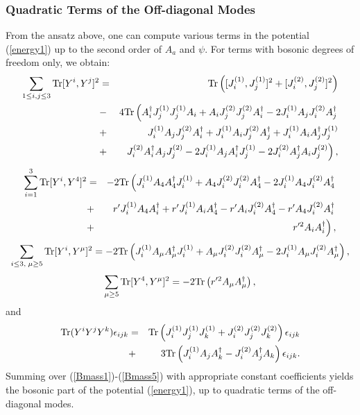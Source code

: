 \documentclass[a4paper,12pt]{article}
\begin{document}
\subsubsection{Quadratic Terms of the Off-diagonal Modes}
From the ansatz above, one can compute various terms in the potential (\ref{energy1}) up to the second order of $A_{a}$ and $\psi$. For terms with bosonic degrees of freedom only, we obtain:
\begin{eqnarray}
\sum_{1\leq i,j\leq 3}{\rm Tr}[Y^{i},Y^{j}]^{2}&=&{\rm Tr}\left([J^{(1)}_{i},J^{(1)}_{j}]^{2}+[J^{(2)}_{i},J^{(2)}_{j}]^{2}\right)\nonumber\\
&-&4{\rm Tr}\left(A_{i}^{\dag}J^{(1)}_{j}J^{(1)}_{j}A_{i}+ A_{i}J^{(2)}_{j}J^{(2)}_{j}A_{i}^{\dag}-2J^{(1)}_{i}A_{j}J^{(2)}_{i}
A_{j}^{\dag}\right.\nonumber\\
&+&J^{(1)}_{i}A_{j}J^{(2)}_{j}A_{i}^{\dag}+J^{(1)}_{i}A_{i}J^{(2)}_{j}A_{j}^{\dag}
+J^{(1)}_{i}A_{i}A_{j}^{\dag}J^{(1)}_{j}\nonumber\\
&+&\left. J^{(2)}_{i}A_{i}^{\dag}A_{j}J^{(2)}_{j}-2J^{(1)}_{i}A_{j}
A_{i}^{\dag}J^{(1)}_{j}-2J^{(2)}_{i}A_{j}^{\dag}A_{i}J^{(2)}_{j}\right),
\label{Bmass1}
\end{eqnarray}
\begin{eqnarray}
\sum_{i=1}^{3}{\rm Tr}[Y^{i},Y^{4}]^{2} &=& -2{\rm Tr}\left(J^{(1)}_{i}A_{4}A_{4}^{\dag}
J^{(1)}_{i}+A_{4}J^{(2)}_{i}J^{(2)}_{i}A_{4}^{\dag}
-2J^{(1)}_{i}A_{4}J^{(2)}_{i}A_{4}^{\dag}
\right.\nonumber\\
&+&\left. r'J^{(1)}_{i}A_{4}A_{i}^{\dag}
+r'J^{(1)}_{i}A_{i}A_{4}^{\dag}-r'A_{i}J^{(2)}_{i}A_{4}^{\dag} 
- r'A_{4}J^{(2)}_{i}A_{i}^{\dag} \right.\nonumber\\
&+& \left.r'^{2}A_{i}A^{\dag}_{i}\right),
\label{Bmass2}
\end{eqnarray}
\begin{equation}
\sum_{i\leq 3,\;\mu\geq 5}{\rm Tr}[Y^{i},Y^{\mu}]^{2}=-2{\rm Tr}
\left(J^{(1)}_{i}A_{\mu}A_{\mu}^{\dag}J^{(1)}_{i}
+A_{\mu}J^{(2)}_{i}J^{(2)}_{i}A_{\mu}^{\dag}
-2J^{(1)}_{i}A_{\mu}J^{(2)}_{i}A_{\mu}^{\dag}\right),
\label{Bmass3}
\end{equation}
\begin{equation}
\sum_{\mu\geq 5}{\rm Tr}[Y^{4},Y^{\mu}]^{2}=-2{\rm Tr}\left(r'^{2}A_{\mu}A^{\dag}_{\mu}\right),
\label{Bmass4}
\end{equation}
and
\begin{eqnarray}
{\rm Tr}(Y^{i}Y^{j}Y^{k})\epsilon_{ijk} &=&{\rm Tr}\left(J_{i}^{(1)}J_{j}^{(1)}J_{k}^{(1)}+J_{i}^{(2)}J_{j}^{(2)}J_{k}^{(2)}\right)\epsilon_{ijk}\nonumber\\
&+&3{\rm Tr}\left(J^{(1)}_{i}A_{j}A^{\dag}_{k}-J^{(2)}_{i}A^{\dag}_{j}A_{k}\right)\epsilon_{ijk}.
\label{Bmass5}
\end{eqnarray}
Summing over (\ref{Bmass1})-(\ref{Bmass5}) with appropriate constant coefficients yields the bosonic part of the potential (\ref{energy1}), up to  quadratic terms of the off-diagonal modes. 
\end{document}
